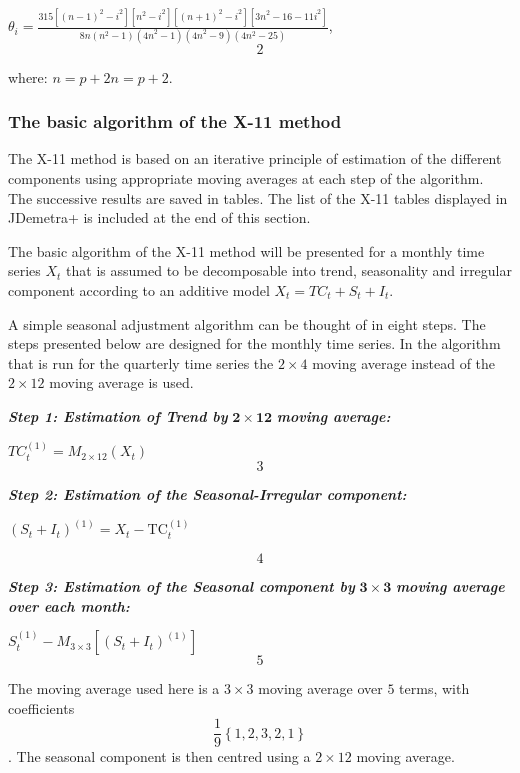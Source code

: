 \documentclass[
  letterpaper,
  DIV=11,
  numbers=noendperiod]{scrreprt}
\begin{document}
\(\theta_{i} = \frac{315\left\lbrack \left( n - 1 \right)^{2} - i^{2} \right\rbrack\left\lbrack n^{2} - i^{2} \right\rbrack\left\lbrack \left( n + 1 \right)^{2} - i^{2} \right\rbrack\left\lbrack {3n}^{2} - 16 - 11i^{2} \right\rbrack}{8n\left( n^{2} - 1 \right)\left( {4n}^{2} - 1 \right)\left( {4n}^{2} - 9 \right)\left( 4n^{2} - 25 \right)}\),
\[2\]

where: \(n = p + 2\)\(n = p + 2\).

\hypertarget{the-basic-algorithm-of-the-x-11-method}{%
\subsubsection{The basic algorithm of the X-11
method}\label{the-basic-algorithm-of-the-x-11-method}}

The X-11 method is based on an iterative principle of estimation of the
different components using appropriate moving averages at each step of
the algorithm. The successive results are saved in tables. The list of
the X-11 tables displayed in JDemetra+ is included at the end of this
section.

The basic algorithm of the X-11 method will be presented for a monthly
time series \(X_{t}\) that is assumed to be decomposable into trend,
seasonality and irregular component according to an additive model
\(X_{t} = TC_{t} + S_{t} + I_{t}\).

A simple seasonal adjustment algorithm can be thought of in eight steps.
The steps presented below are designed for the monthly time series. In
the algorithm that is run for the quarterly time series the
\(2 \times 4\) moving average instead of the \(2 \times 12\) moving
average is used.

\textbf{\emph{Step 1: Estimation of Trend by}} \(\mathbf{2 \times 12}\)
\textbf{\emph{moving average:}}

\(TC_{t}^{(1)} = M_{2 \times 12}(X_{t})\) \[3\]

\textbf{\emph{Step 2: Estimation of the Seasonal-Irregular component:}}

\(\left( S_{t} + I_{t} \right)^{(1)} = X_{t} - \text{TC}_{t}^{(1)}\)

\[4\]

\textbf{\emph{Step 3: Estimation of the Seasonal component by}}
\(\mathbf{3 \times 3}\) \textbf{\emph{moving average over each month:}}

\(S_{t}^{(1)} - M_{3 \times 3}\left\lbrack \left( S_{t} + I_{t} \right)^{(1)} \right\rbrack\)
\[5\]

The moving average used here is a \(3 \times 3\) moving average over
\(5\) terms, with coefficients
\[\frac{1}{9} \left\{1, 2, 3, 2, 1 \right\}\]. The seasonal component is
then centred using a \(2 \times 12\) moving average.
\end{document}
